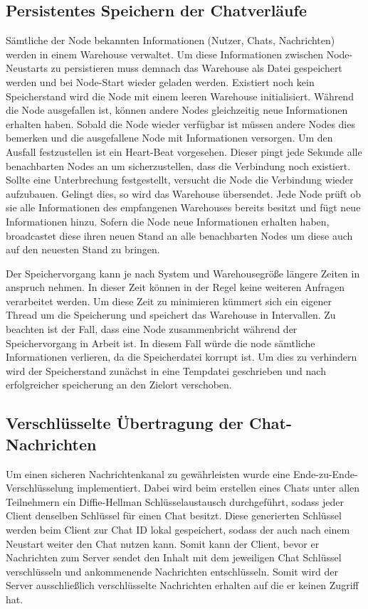 \author{Matthias Vonend}
\subsection{Persistentes Speichern der Chatverläufe}\label{persistance}
Sämtliche der Node bekannten Informationen (Nutzer, Chats, Nachrichten) werden in einem Warehouse verwaltet. Um diese Informationen zwischen Node-Neustarts zu persistieren muss demnach das Warehouse als Datei gespeichert werden und bei Node-Start wieder geladen werden. Existiert noch kein Speicherstand wird die Node mit einem leeren Warehouse initialisiert. Während die Node ausgefallen ist, können andere Nodes gleichzeitig neue Informationen erhalten haben. Sobald die Node wieder verfügbar ist müssen andere Nodes dies bemerken und die ausgefallene Node mit Informationen versorgen. Um den Ausfall festzustellen ist ein Heart-Beat vorgesehen. Dieser pingt jede Sekunde alle benachbarten Nodes an um sicherzustellen, dass die Verbindung noch existiert. Sollte eine Unterbrechung festgestellt, versucht die Node die Verbindung wieder aufzubauen. Gelingt dies, so wird das Warehouse übersendet. Jede Node prüft ob sie alle Informationen des empfangenen Warehouses bereits besitzt und fügt neue Informationen hinzu. Sofern die Node neue Informationen erhalten haben, broadcastet diese ihren neuen Stand an alle benachbarten Nodes um diese auch auf den neuesten Stand zu bringen.

Der Speichervorgang kann je nach System und Warehousegröße längere Zeiten in anspruch nehmen. In dieser Zeit können in der Regel keine weiteren Anfragen verarbeitet werden. Um diese Zeit zu minimieren kümmert sich ein eigener Thread um die Speicherung und speichert das Warehouse in Intervallen.
Zu beachten ist der Fall, dass eine Node zusammenbricht während der Speichervorgang in Arbeit ist. In diesem Fall würde die node sämtliche Informationen verlieren, da die Speicherdatei korrupt ist. Um dies zu verhindern wird der Speicherstand zunächst in eine Tempdatei geschrieben und nach erfolgreicher speicherung an den Zielort verschoben.

\author{Troy Keßler, Michael Angermeier}
\subsection{Verschlüsselte Übertragung der Chat-Nachrichten}\label{encryption}
Um einen sicheren Nachrichtenkanal zu gewährleisten wurde eine 
Ende-zu-Ende-Verschlüsselung implementiert. Dabei wird beim
erstellen eines Chats unter allen Teilnehmern ein Diffie-Hellman 
Schlüsselaustausch durchgeführt, sodass jeder Client denselben 
Schlüssel für einen Chat besitzt. Diese generierten Schlüssel 
werden beim Client zur Chat ID lokal gespeichert, sodass der
auch nach einem Neustart weiter den Chat nutzen kann. Somit kann 
der Client, bevor er Nachrichten zum Server sendet den Inhalt mit dem 
jeweiligen Chat Schlüssel verschlüsseln und ankommenende 
Nachrichten entschlüsseln. Somit wird der Server ausschließlich
verschlüsselte Nachrichten erhalten auf die er keinen Zugriff hat.

